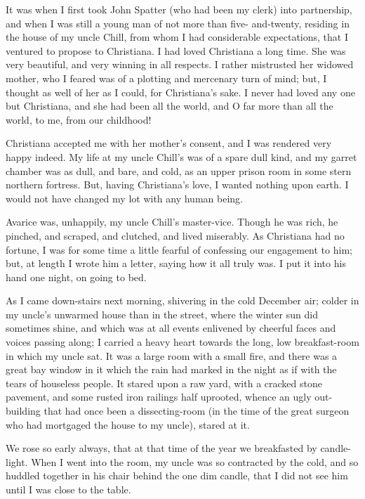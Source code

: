 It was when I first took John Spatter (who had been my clerk) into
partnership, and when I was still a young man of not more than five-%
and-twenty, residing in the house of my uncle Chill, from whom I had
considerable expectations, that I ventured to propose to Christiana.
I had loved Christiana a long time.  She was very beautiful, and
very winning in all respects.  I rather mistrusted her widowed
mother, who I feared was of a plotting and mercenary turn of mind;
but, I thought as well of her as I could, for Christiana's sake.  I
never had loved any one but Christiana, and she had been all the
world, and O far more than all the world, to me, from our childhood!

Christiana accepted me with her mother's consent, and I was rendered
very happy indeed.  My life at my uncle Chill's was of a spare dull
kind, and my garret chamber was as dull, and bare, and cold, as an
upper prison room in some stern northern fortress.  But, having
Christiana's love, I wanted nothing upon earth.  I would not have
changed my lot with any human being.

Avarice was, unhappily, my uncle Chill's master-vice.  Though he was
rich, he pinched, and scraped, and clutched, and lived miserably.
As Christiana had no fortune, I was for some time a little fearful
of confessing our engagement to him; but, at length I wrote him a
letter, saying how it all truly was.  I put it into his hand one
night, on going to bed.

As I came down-stairs next morning, shivering in the cold December
air; colder in my uncle's unwarmed house than in the street, where
the winter sun did sometimes shine, and which was at all events
enlivened by cheerful faces and voices passing along; I carried a
heavy heart towards the long, low breakfast-room in which my uncle
sat.  It was a large room with a small fire, and there was a great
bay window in it which the rain had marked in the night as if with
the tears of houseless people.  It stared upon a raw yard, with a
cracked stone pavement, and some rusted iron railings half uprooted,
whence an ugly out-building that had once been a dissecting-room (in
the time of the great surgeon who had mortgaged the house to my
uncle), stared at it.

We rose so early always, that at that time of the year we
breakfasted by candle-light.  When I went into the room, my uncle
was so contracted by the cold, and so huddled together in his chair
behind the one dim candle, that I did not see him until I was close
to the table.


